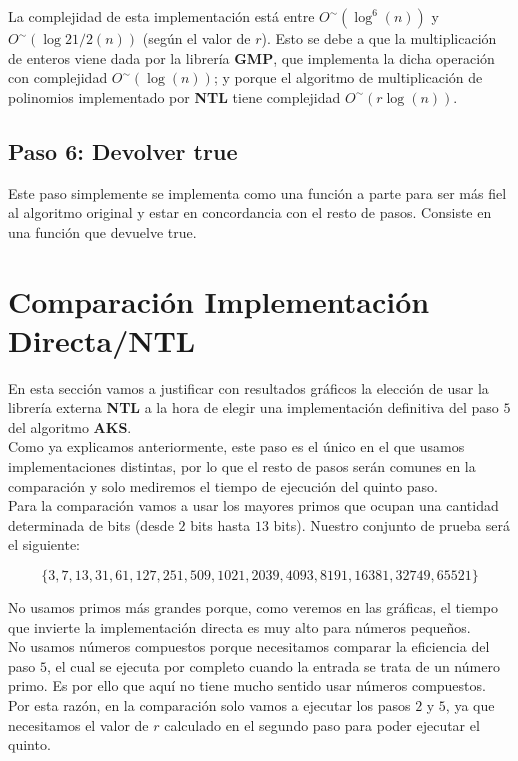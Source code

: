 La complejidad de esta implementación está entre $O^\sim(\log^6(n))$ y $O^\sim(\log{21/2}(n))$ (según el valor de $r$). Esto se debe a que la multiplicación de enteros viene dada por la librería \textbf{GMP}, que implementa la dicha operación con complejidad $O^\sim(\log(n))$; y porque el algoritmo de multiplicación de polinomios implementado por \textbf{NTL} tiene complejidad $O^\sim(r\log(n))$.

\subsection{Paso 6: Devolver true}

Este paso simplemente se implementa como una función a parte para ser más fiel al algoritmo original y estar en concordancia con el resto de pasos. Consiste en una función que devuelve true.

\section{Comparación Implementación Directa/NTL}

En esta sección vamos a justificar con resultados gráficos la elección de usar la librería externa \textbf{NTL} a la hora de elegir una implementación definitiva del paso $5$ del algoritmo \textbf{AKS}.\\

Como ya explicamos anteriormente, este paso es el único en el que usamos implementaciones distintas, por lo que el resto de pasos serán comunes en la comparación y solo mediremos el tiempo de ejecución del quinto paso.\\

Para la comparación vamos a usar los mayores primos que ocupan una cantidad determinada de bits (desde $2$ bits hasta $13$ bits). Nuestro conjunto de prueba será el siguiente:

\[ \{ 3, 7, 13, 31, 61, 127, 251, 509,
1021, 2039, 4093, 8191, 16381, 32749,
65521 \} \]

No usamos primos más grandes porque, como veremos en las gráficas, el tiempo que invierte la implementación directa es muy alto para números pequeños.\\

No usamos números compuestos porque necesitamos comparar la eficiencia del paso $5$, el cual se ejecuta por completo cuando la entrada se trata de un número primo. Es por ello que aquí no tiene mucho sentido usar números compuestos. Por esta razón, en la comparación solo vamos a ejecutar los pasos $2$ y $5$, ya que necesitamos el valor de $r$ calculado en el segundo paso para poder ejecutar el quinto.

